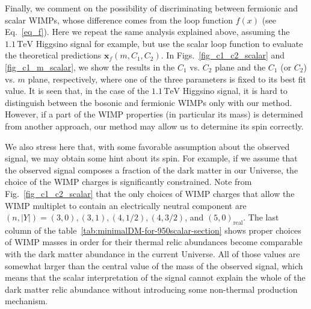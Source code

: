 \documentclass[12pt,twoside,book]{article}
\begin{document}
Finally, we comment on the possibility of discriminating between fermionic and scalar WIMPs, whose difference comes from the loop function $f(x)$ (see Eq.~\eqref{eq_f}).
Here we repeat the same analysis explained above, assuming the $1.1\,\mathrm{TeV}$ Higgsino signal for example, but use the scalar loop function to evaluate the theoretical predictions $\bm{x}_f (m, C_1, C_2)$.
In Figs.~\ref{fig_c1_c2_scalar} and \ref{fig_c1_m_scalar}, we show the results in the $C_1$ vs. $C_2$ plane and the $C_1$ (or $C_2$) vs. $m$ plane, respectively, where one of the three parameters is fixed to its best fit value.
It is seen that, in the case of the $1.1\,\mathrm{TeV}$ Higgsino signal, it is hard to distinguish between the bosonic and fermionic WIMPs only with our method.
However, if a part of the WIMP properties (in particular its mass) is determined from another approach, our method may allow us to determine its spin correctly.

We also stress here that, with some favorable assumption about the observed signal, we may obtain some hint about its spin.
For example, if we assume that the observed signal composes a fraction of the dark matter in our Universe, the choice of the WIMP charges is significantly constrained.
Note from Fig.~\ref{fig_c1_c2_scalar} that the only choices of WIMP charges that allow the WIMP multiplet to contain an electrically neutral component are $(n,|Y|)=(3,0),(3,1),(4,1/2),(4,3/2)$, and $(5,0)_\text{real}$.
The last column of the table~\ref{tab:minimalDM-for-950scalar-section} shows proper choices of WIMP masses in order for their thermal relic abundances become comparable with the dark matter abundance in the current Universe.
All of those values are somewhat larger than the central value of the mass of the observed signal, which means that the scalar interpretation of the signal cannot explain the whole of the dark matter relic abundance without introducing some non-thermal production mechanism.
\end{document}

